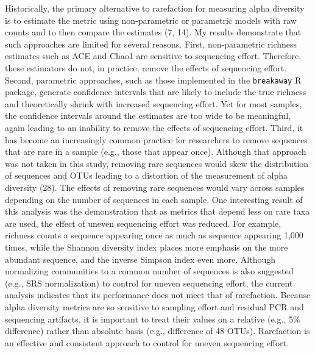 \documentclass[
]{article}
\begin{document}
Historically, the primary alternative to rarefaction for measuring alpha
diversity is to estimate the metric using non-parametric or parametric
models with raw counts and to then compare the estimates (7, 14). My
results demonstrate that such approaches are limited for several
reasons. First, non-parametric richness estimates such as ACE and Chao1
are sensitive to sequencing effort. Therefore, these estimators do not,
in practice, remove the effects of sequencing effort. Second, parametric
approaches, such as those implemented in the \texttt{breakaway} R
package, generate confidence intervals that are likely to include the
true richness and theoretically shrink with increased sequencing effort.
Yet for most samples, the confidence intervals around the estimates are
too wide to be meaningful, again leading to an inability to remove the
effects of sequencing effort. Third, it has become an increasingly
common practice for researchers to remove sequences that are rare in a
sample (e.g., those that appear once). Although that approach was not
taken in this study, removing rare sequences would skew the distribution
of sequences and OTUs leading to a distortion of the measurement of
alpha diversity (28). The effects of removing rare sequences would vary
across samples depending on the number of sequences in each sample. One
interesting result of this analysis was the demonstration that as
metrics that depend less on rare taxa are used, the effect of uneven
sequencing effort was reduced. For example, richness counts a sequence
appearing once as much as sequence appearing 1,000 times, while the
Shannon diversity index places more emphasis on the more abundant
sequence, and the inverse Simpson index even more. Although normalizing
communities to a common number of sequences is also suggested (e.g., SRS
normalization) to control for uneven sequencing effort, the current
analysis indicates that its performance does not meet that of
rarefaction. Because alpha diversity metrics are so sensitive to
sampling effort and residual PCR and sequencing artifacts, it is
important to treat their values on a relative (e.g., 5\% difference)
rather than absolute basis (e.g., difference of 48 OTUs). Rarefaction is
an effective and consistent approach to control for uneven sequencing
effort.
\end{document}
